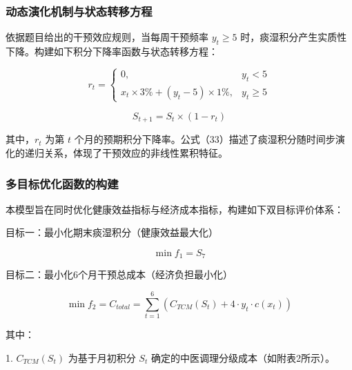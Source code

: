 \documentclass[12pt]{article}
\begin{document}
	\subsubsection{动态演化机制与状态转移方程}
	{\songti{}
		依据题目给出的干预效应规则，当每周干预频率 $y_t \ge 5$ 时，痰湿积分产生实质性下降。构建如下积分下降率函数与状态转移方程：
		\par}
	
	\begin{equation}
		r_t =
		\begin{cases}
			0, & y_t < 5 \\
			x_t \times 3\% + (y_t - 5) \times 1\%, & y_t \ge 5
		\end{cases}
	\end{equation}
	
	\begin{equation}
		S_{t+1} = S_t \times (1 - r_t)
	\end{equation}
	
	{\songti{}
		其中，$r_t$ 为第 $t$ 个月的预期积分下降率。公式（33）描述了痰湿积分随时间步演化的递归关系，体现了干预效应的非线性累积特征。
		\par}
	
	\subsubsection{多目标优化函数的构建}
	{\songti{}
		本模型旨在同时优化健康效益指标与经济成本指标，构建如下双目标评价体系：
		\par}
	
	{\songti{}
		目标一：最小化期末痰湿积分（健康效益最大化）
		\par}
	
	\begin{equation}
		\min f_1 = S_7
	\end{equation}
	
	{\songti{}
		目标二：最小化6个月干预总成本（经济负担最小化）
		\par}
	
	\begin{equation}
		\min f_2 = C_{total} = \sum_{t=1}^{6} \left( C_{TCM}(S_t) + 4 \cdot y_t \cdot c(x_t) \right)
	\end{equation}
	
	{\songti{}
		其中：
		\par}
	
	{\songti{}
		1.  $C_{TCM}(S_t)$ 为基于月初积分 $S_t$ 确定的中医调理分级成本（如附表2所示）。
		\par}
	
\end{document}

